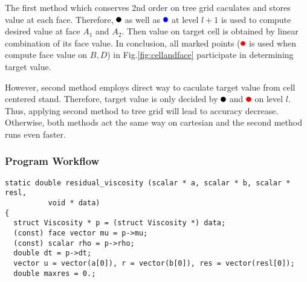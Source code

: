 \documentclass[a4paper]{article}
\newcommand{\para}[1]{\textbf{\emph{\textcolor{para}{#1}}}}
\newcommand{\activetest}{\tikz \fill[black] (3pt,3pt) circle (3pt);}
\newcommand{\prolong}{\tikz \fill[blue] (3pt,3pt) circle (3pt);}
\newcommand{\rest}{\tikz \fill[red] (3pt,3pt) circle (3pt);}
\begin{document}
The first method which conserves 2nd order on tree grid caculates and stores value at each face. Therefore, $\activetest$ as well as $\prolong$ at level $l+1$ is used to compute desired value at face $A_1$ and $A_2$. Then value on target cell is obtained by linear combination of its face value. In conclusion, all marked points ($\rest$ is used when compute face value on $B,D$) in Fig.\ref{fig:cellandface} participate in determining target value. \par
However, second method employs direct way to caculate target value from cell centered stand. Therefore, target value is only decided by $\activetest$ and $\rest$ on level $l$. Thus, applying second method to tree grid will lead to accuracy decrease. Otherwise, both methods act the same way on cartesian and the second method runs even faster. 
\subsubsection{Program Workflow}
\begin{multicols}{2}
  \columnbreak
  \begin{verbatim}
static double residual_viscosity (scalar * a, scalar * b, scalar * resl, 
          void * data)
{
  struct Viscosity * p = (struct Viscosity *) data;
  (const) face vector mu = p->mu;
  (const) scalar rho = p->rho;
  double dt = p->dt;
  vector u = vector(a[0]), r = vector(b[0]), res = vector(resl[0]);
  double maxres = 0.;
  \end{verbatim}
\end{multicols}

\begin{center}
\end{center}
\end{document}
